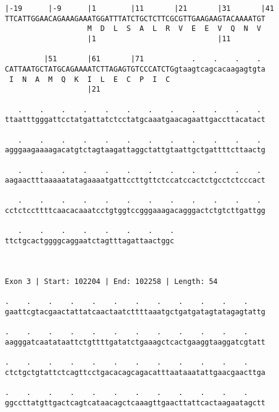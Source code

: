 \documentclass{article}
\begin{document}
\begin{Verbatim}
|-19      |-9      |1        |11       |21       |31       |41
TTCATTGGAACAGAAAGAAATGGATTTATCTGCTCTTCGCGTTGAAGAAGTACAAAATGT
                   M  D  L  S  A  L  R  V  E  E  V  Q  N  V 
                   |1                            |11        
  
         |51       |61       |71           .    .    .    . 
CATTAATGCTATGCAGAAAATCTTAGAGTGTCCCATCTGgtaagtcagcacaagagtgta
 I  N  A  M  Q  K  I  L  E  C  P  I  C                      
                   |21                                      
  
   .    .    .    .    .    .    .    .    .    .    .    . 
ttaatttgggattcctatgattatctcctatgcaaatgaacagaattgaccttacatact
                                                            
   .    .    .    .    .    .    .    .    .    .    .    . 
agggaagaaaagacatgtctagtaagattaggctattgtaattgctgattttcttaactg
                                                            
   .    .    .    .    .    .    .    .    .    .    .    . 
aagaactttaaaaatatagaaaatgattccttgttctccatccactctgcctctcccact
                                                            
   .    .    .    .    .    .    .    .    .    .    .    . 
cctctccttttcaacacaaatcctgtggtccgggaaagacagggactctgtcttgattgg
                                                            
   .    .    .    .    .    .    .    .
ttctgcactggggcaggaatctagtttagattaactggc
                                       
                                       
 
Exon 3 | Start: 102204 | End: 102258 | Length: 54
 
.    .    .    .    .    .    .    .    .    .    .    .    
gaattcgtacgaactattatcaactaatcttttaaatgctgatgatagtatagagtattg
                                                            
.    .    .    .    .    .    .    .    .    .    .    .    
aagggatcaatataattctgttttgatatctgaaagctcactgaaggtaaggatcgtatt
                                                            
.    .    .    .    .    .    .    .    .    .    .    .    
ctctgctgtattctcagttcctgacacagcagacatttaataaatattgaacgaacttga
                                                            
.    .    .    .    .    .    .    .    .    .    .    .    
ggccttatgttgactcagtcataacagctcaaagttgaacttattcactaagaatagctt
                                                            

\end{Verbatim}
\end{document}
